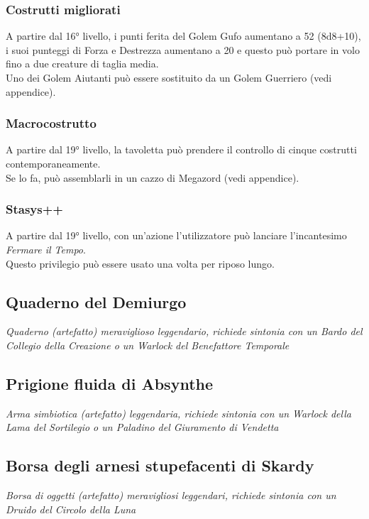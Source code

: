 \subsubsection{Costrutti migliorati}
A partire dal 16° livello, i punti ferita del Golem Gufo aumentano a 52 (8d8+10), i suoi punteggi di Forza e Destrezza aumentano a 20 e questo può portare in volo fino a due creature di taglia media.\\
Uno dei Golem Aiutanti può essere sostituito da un Golem Guerriero (vedi appendice).

\subsubsection{Macrocostrutto}
A partire dal 19° livello, la tavoletta può prendere il controllo di cinque costrutti contemporaneamente.\\ Se lo fa, può assemblarli in un cazzo di Megazord (vedi appendice).

\subsubsection{Stasys++}
A partire dal 19° livello, con un'azione l'utilizzatore può lanciare l'incantesimo \textit{Fermare il Tempo}.\\
Questo privilegio può essere usato una volta per riposo lungo.

\subsection{Quaderno del Demiurgo}
\textit{Quaderno (artefatto) meraviglioso leggendario, richiede sintonia con un Bardo del Collegio della Creazione o un Warlock del Benefattore Temporale}

\subsubsection{}

\subsection{Prigione fluida di Absynthe}
\textit{Arma simbiotica (artefatto) leggendaria, richiede sintonia con un Warlock della Lama del Sortilegio o un Paladino del Giuramento di Vendetta}

\subsection{Borsa degli arnesi stupefacenti di Skardy}
\textit{Borsa di oggetti (artefatto) meravigliosi leggendari, richiede sintonia con un Druido del Circolo della Luna}

